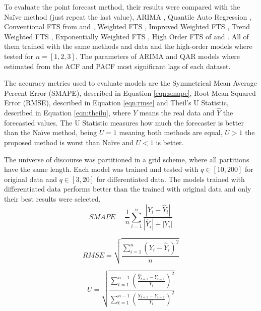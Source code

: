 To evaluate the point forecast method, their results were compared with the Na\"{i}ve method (just repeat the last value), ARIMA \citep{boxjenkins1970}, Quantile Auto Regression \citep{Koenker2001}, Conventional FTS from \cite{song1993fuzzy} and \cite{chen1996forecasting}, Weighted FTS  \citep{yu2005weighted}, Improved Weighted FTS \citep{ismail2011enrollment}, Trend Weighted FTS \citep{Cheng2008}, Exponentially Weighted FTS \citep{Sadaei2013}, High Order FTS of \cite{Chen2011} and \cite{hwang1998handling}. All of them trained with the same methods and data and the high-order models where tested for $n = [1,2,3]$. The parameters of ARIMA and QAR models where estimated from the ACF and PACF most significant lags of each dataset.


The accuracy metrics used to evaluate models are the Symmetrical Mean Average Percent Error (SMAPE), described in Equation \eqref{eqn:smape}, Root Mean Squared Error (RMSE), described in Equation \eqref{eqn:rmse} and Theil's U Statistic, described in Equation \eqref{eqn:theilu},  where $Y$ means the real data and $\hat{Y}$ the forecasted values. The U Statistic measures how much the forecaster is better than the Na\"{i}ve method, being $U = 1$ meaning both methods are equal, $U > 1$ the proposed method is worst than Na\"{i}ve and $U < 1$ is better.  

The universe of discourse was partitioned in a grid scheme, where all partitions have the same length. Each model was trained and tested with $q \in [10,200]$ for original data and $q \in [3,20]$ for differentiated data. The models trained with differentiated data performs better than the trained with original data and only their best results were selected.
\begin{equation}
SMAPE = \frac{1}{n} \sum_{i=1}^n  \frac{|Y_i - \hat{Y}_i|}{|\hat{Y}_i| +  |Y_i|} 
\label{eqn:smape}
\end{equation}

\begin{equation}
RMSE = \sqrt{\frac{\sum_{i=1}^n (Y_i - \hat{Y}_i)^2}{n}}
\label{eqn:rmse}
\end{equation}

\begin{equation}
U = \sqrt{\frac{\sum_{t=1}^{n-1} \left( \frac{\hat{Y}_{t+1}-Y_{t-1}}{Y_t} \right)^2}{\sum_{t=1}^{n-1} \left( \frac{Y_{t+1}-Y_{t-1}}{Y_t} \right)^2}}
\label{eqn:theilu}
\end{equation}

